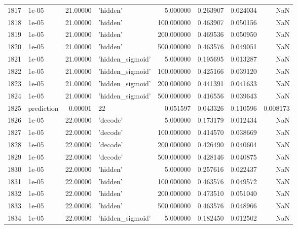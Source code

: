 \documentclass[10pt,a4paper]{article}
\begin{document}
\begin{tabular}{llrlrrrr}
1817 &       1e-05 &  21.00000 &           'hidden' &    5.000000 &  0.263907 &  0.024034 &       NaN \\
1818 &       1e-05 &  21.00000 &           'hidden' &  100.000000 &  0.463907 &  0.050156 &       NaN \\
1819 &       1e-05 &  21.00000 &           'hidden' &  200.000000 &  0.469536 &  0.050950 &       NaN \\
1820 &       1e-05 &  21.00000 &           'hidden' &  500.000000 &  0.463576 &  0.049051 &       NaN \\
1821 &       1e-05 &  21.00000 &   'hidden\_sigmoid' &    5.000000 &  0.195695 &  0.013287 &       NaN \\
1822 &       1e-05 &  21.00000 &   'hidden\_sigmoid' &  100.000000 &  0.425166 &  0.039120 &       NaN \\
1823 &       1e-05 &  21.00000 &   'hidden\_sigmoid' &  200.000000 &  0.441391 &  0.041633 &       NaN \\
1824 &       1e-05 &  21.00000 &   'hidden\_sigmoid' &  500.000000 &  0.416556 &  0.039643 &       NaN \\
1825 &  prediction &   0.00001 &                 22 &    0.051597 &  0.043326 &  0.110596 &  0.008173 \\
1826 &       1e-05 &  22.00000 &           'decode' &    5.000000 &  0.173179 &  0.012434 &       NaN \\
1827 &       1e-05 &  22.00000 &           'decode' &  100.000000 &  0.414570 &  0.038669 &       NaN \\
1828 &       1e-05 &  22.00000 &           'decode' &  200.000000 &  0.426490 &  0.040604 &       NaN \\
1829 &       1e-05 &  22.00000 &           'decode' &  500.000000 &  0.428146 &  0.040875 &       NaN \\
1830 &       1e-05 &  22.00000 &           'hidden' &    5.000000 &  0.257616 &  0.022437 &       NaN \\
1831 &       1e-05 &  22.00000 &           'hidden' &  100.000000 &  0.463576 &  0.049572 &       NaN \\
1832 &       1e-05 &  22.00000 &           'hidden' &  200.000000 &  0.473510 &  0.051040 &       NaN \\
1833 &       1e-05 &  22.00000 &           'hidden' &  500.000000 &  0.463576 &  0.048966 &       NaN \\
1834 &       1e-05 &  22.00000 &   'hidden\_sigmoid' &    5.000000 &  0.182450 &  0.012502 &       NaN \\

\end{tabular}
\end{document}
